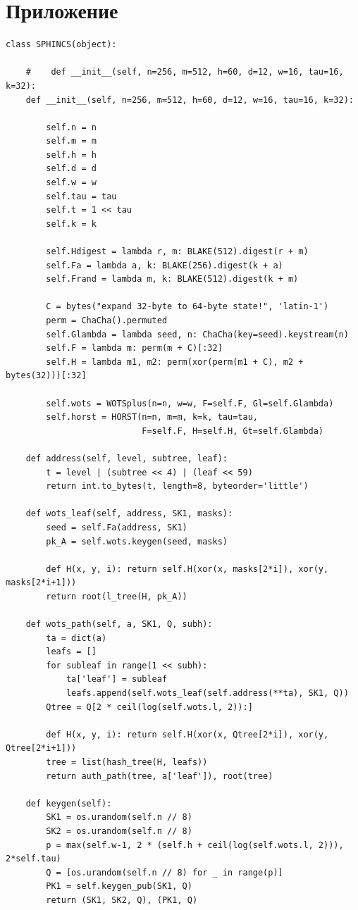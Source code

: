 \documentclass[a4paper, 14pt]{extarticle}
\begin{document}
\section{Приложение}
\begin{verbatim}
class SPHINCS(object):

    #    def __init__(self, n=256, m=512, h=60, d=12, w=16, tau=16, k=32):
    def __init__(self, n=256, m=512, h=60, d=12, w=16, tau=16, k=32):

        self.n = n
        self.m = m
        self.h = h
        self.d = d
        self.w = w
        self.tau = tau
        self.t = 1 << tau
        self.k = k

        self.Hdigest = lambda r, m: BLAKE(512).digest(r + m)
        self.Fa = lambda a, k: BLAKE(256).digest(k + a)
        self.Frand = lambda m, k: BLAKE(512).digest(k + m)

        C = bytes("expand 32-byte to 64-byte state!", 'latin-1')
        perm = ChaCha().permuted
        self.Glambda = lambda seed, n: ChaCha(key=seed).keystream(n)
        self.F = lambda m: perm(m + C)[:32]
        self.H = lambda m1, m2: perm(xor(perm(m1 + C), m2 + bytes(32)))[:32]

        self.wots = WOTSplus(n=n, w=w, F=self.F, Gl=self.Glambda)
        self.horst = HORST(n=n, m=m, k=k, tau=tau,
                           F=self.F, H=self.H, Gt=self.Glambda)

    def address(self, level, subtree, leaf):
        t = level | (subtree << 4) | (leaf << 59)
        return int.to_bytes(t, length=8, byteorder='little')

    def wots_leaf(self, address, SK1, masks):
        seed = self.Fa(address, SK1)
        pk_A = self.wots.keygen(seed, masks)

        def H(x, y, i): return self.H(xor(x, masks[2*i]), xor(y, masks[2*i+1]))
        return root(l_tree(H, pk_A))

    def wots_path(self, a, SK1, Q, subh):
        ta = dict(a)
        leafs = []
        for subleaf in range(1 << subh):
            ta['leaf'] = subleaf
            leafs.append(self.wots_leaf(self.address(**ta), SK1, Q))
        Qtree = Q[2 * ceil(log(self.wots.l, 2)):]

        def H(x, y, i): return self.H(xor(x, Qtree[2*i]), xor(y, Qtree[2*i+1]))
        tree = list(hash_tree(H, leafs))
        return auth_path(tree, a['leaf']), root(tree)

    def keygen(self):
        SK1 = os.urandom(self.n // 8)
        SK2 = os.urandom(self.n // 8)
        p = max(self.w-1, 2 * (self.h + ceil(log(self.wots.l, 2))), 2*self.tau)
        Q = [os.urandom(self.n // 8) for _ in range(p)]
        PK1 = self.keygen_pub(SK1, Q)
        return (SK1, SK2, Q), (PK1, Q)


\end{verbatim}
\end{document}
